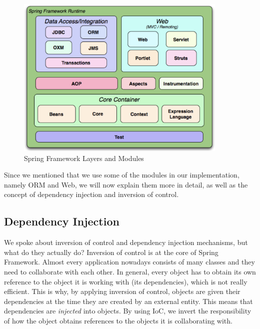 \begin{figure}[hbt!]
    \begin{center}
        \includegraphics[width=0.9\textwidth]{graphics/4-background/1}
    \end{center}
    \caption{Spring Framework Layers and Modules~\citep{introtospringframework}}
    \label{fig:figure4.6}
\end{figure}

Since we mentioned that we use some of the modules in our implementation, namely ORM and Web, we will now explain them more in detail, as well
as the concept of dependency injection and inversion of control.

\subsection{Dependency Injection}\label{subsec:dependency-injection}

We spoke about inversion of control and dependency injection mechanisms, but what do they actually do? Inversion of control is at the core of
Spring Framework. Almost every application nowadays consists of many classes and they need to collaborate with each other. In
general, every object has to obtain its own reference to the object it is working with (its dependencies), which is not really efficient.
This is why, by applying inversion of control, objects are given their dependencies at the time they are created by an external entity. This
means that dependencies are \emph{injected} into objects. By using IoC, we invert the responsibility of how the object obtains references to
the objects it is collaborating with.

